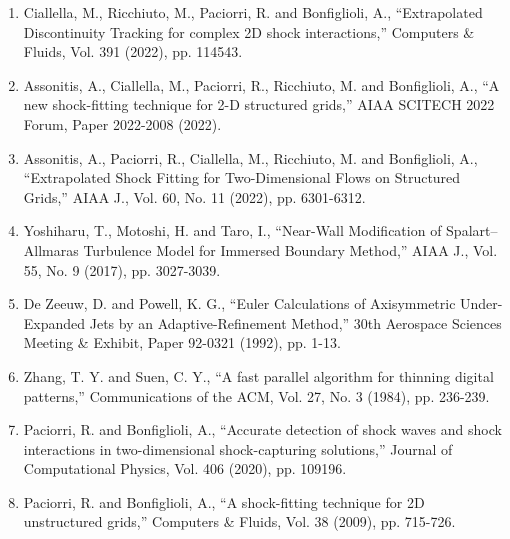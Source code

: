 \documentclass[a4j]{jarticle}
\begin{document}
\begin{enumerate}
    \item Ciallella, M., Ricchiuto, M., Paciorri, R. and Bonfiglioli, A., ``Extrapolated Discontinuity Tracking for complex 2D shock interactions,''
     Computers \& Fluids, Vol. 391 (2022), pp. 114543.
\label{ref:eDIT}
    \item Assonitis, A., Ciallella, M., Paciorri, R., Ricchiuto, M. and Bonfiglioli, A., ``A new shock-fitting technique for 2-D structured grids,''
     AIAA SCITECH 2022 Forum, Paper 2022-2008 (2022).
\label{ref:SESF}
    \item Assonitis, A., Paciorri, R., Ciallella, M., Ricchiuto, M. and Bonfiglioli, A., ``Extrapolated Shock Fitting for Two-Dimensional Flows on Structured Grids,''
     AIAA J., Vol. 60, No. 11 (2022), pp. 6301-6312.
\label{ref:SF}
    \item Yoshiharu, T., Motoshi, H. and Taro, I., ``Near-Wall Modification of Spalart–Allmaras Turbulence Model for Immersed Boundary Method,''
     AIAA J., Vol. 55, No. 9 (2017), pp. 3027-3039.
\label{ref:IBM}
    \item De Zeeuw, D. and Powell, K. G., ``Euler Calculations of Axisymmetric Under-Expanded Jets by an Adaptive-Refinement Method,''
     30th Aerospace Sciences Meeting \& Exhibit, Paper 92-0321 (1992), pp. 1-13. 
\label{ref:AMR}
    \item Zhang, T. Y. and Suen, C. Y., ``A fast parallel algorithm for thinning digital patterns,''  
     Communications of the ACM, Vol. 27, No. 3 (1984), pp. 236-239.
\label{ref:skelton}
    \item Paciorri, R. and Bonfiglioli, A., ``Accurate detection of shock waves and shock interactions in two-dimensional shock-capturing solutions,''
     Journal of Computational Physics, Vol. 406 (2020), pp. 109196.
\label{ref:intera}
     \item Paciorri, R. and Bonfiglioli, A., ``A shock-fitting technique for 2D unstructured grids,''
      Computers \& Fluids, Vol. 38 (2009), pp. 715-726.
\label{ref:effdomain}
    \end{enumerate}
\end{document}
